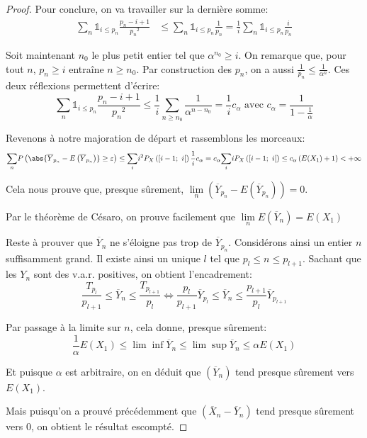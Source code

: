 \begin{proof}
Pour conclure, on va travailler sur la dernière somme:
\begin{align*}
\displaystyle{\sum \limits_n} \mathbb{1}_{i \leq p_n} \frac{p_n-i+1}{{p_n}^2} & \leq \displaystyle{\sum \limits_n} \mathbb{1}_{i \leq p_n} \frac{1}{p_n} =  \frac{1}{i} \displaystyle{\sum \limits_n} \mathbb{1}_{i \leq p_n} \frac{i}{p_n}
\end{align*}

Soit maintenant $n_0$ le plus petit entier tel que $\alpha^{n_0} \geq i$. On remarque que, pour tout $n$, $p_n \geq i$ entraîne $n \geq n_0$. Par construction des $p_n$, on a aussi $\frac{1}{p_n} \leq \frac{1}{\alpha^n}$. Ces deux réflexions permettent d'écrire:
\[
\displaystyle{\sum \limits_n} \mathbb{1}_{i \leq p_n} \frac{p_n-i+1}{{p_n}^2} \leq \frac{1}{i} \displaystyle{\sum \limits_{n \geq n_0}} \frac{1}{\alpha^{n-n_0}}  = \frac{1}{i} c_{\alpha} \text{ avec } c_{\alpha} = \frac{1}{1-\tfrac{1}{\alpha}}
\]

Revenons à notre majoration de départ et rassemblons les morceaux:
\[
\displaystyle{\sum \limits_n} P \left ( \abs{\overline{Y}_{p_n} - E \left ( \overline{Y}_{p_n} \right )} \geq \varepsilon
 \right ) \leq \displaystyle{\sum \limits_i} i^2 P_X\left ([i-1;~i[ \right ) \frac{1}{i} c_{\alpha} = c_{\alpha} \displaystyle{\sum \limits_i} i P_X\left ([i-1;~i[ \right ) \leq c_{\alpha} \left (E(X_1)+1\right ) < +\infty
\]


Cela nous prouve que, presque sûrement, $\lim \limits_{n} \left (\overline{Y}_{p_n} - E \left ( \overline{Y}_{p_n} \right ) \right )= 0$.

\medskip
Par le théorème de Césaro, on prouve facilement que $\lim \limits_{n} E \left ( \overline{Y}_n \right ) = E(X_1)$

\medskip
Reste à prouver que $\overline{Y}_n$ ne s'éloigne pas trop de $\overline{Y}_{p_n}$. Considérons ainsi un entier $n$ suffisamment grand. Il existe ainsi un unique $l$ tel que $p_l \leq n \leq p_{l+1}$. Sachant que les $Y_n$ sont des v.a.r. positives, on obtient l'encadrement:
\[
\frac{T_{p_l}}{p_{l+1}} \leq \overline{Y}_n \leq \frac{T_{p_{l+1}}}{p_{l}} \iff \frac{p_l}{p_{l+1}} \overline{Y}_{p_l} \leq \overline{Y}_n \leq \frac{p_{l+1}}{p_{l}} \overline{Y}_{p_{l+1}}
\]

Par passage à la limite sur $n$, cela donne, presque sûrement:
\[
\frac{1}{\alpha} E(X_1) \leq \lim \inf \overline{Y}_n  \leq \lim \sup \overline{Y}_n \leq \alpha E(X_1)
\]

Et puisque $\alpha$ est arbitraire, on en déduit que $\left (\overline{Y}_n\right )$ tend presque sûrement vers $E(X_1)$.

Mais puisqu'on a prouvé précédemment que $\left ( \overline{X}_n - \overline{Y}_n \right )$ tend presque sûrement vers $0$, on obtient le résultat escompté.
\end{proof}


